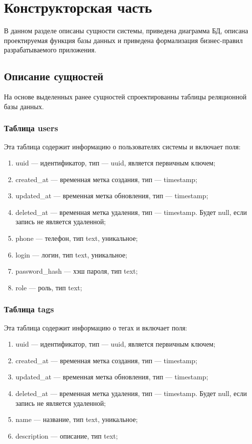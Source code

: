 \section{Конструкторская часть}

В данном разделе описаны сущности системы, приведена диаграмма БД, описана проектируемая функция базы данных и приведена формализация бизнес-правил разрабатываемого приложения.

\subsection{Описание сущностей}

На основе выделенных ранее сущностей спроектированны таблицы реляционной базы данных.

\subsubsection{Таблица users}

Эта таблица содержит информацию о пользователях системы и включает поля:

\begin{enumerate}[label=\arabic*.]
    \item uuid --- идентификатор, тип --- uuid, является первичным ключем;
    \item created\_at --- временная метка создания, тип --- timestamp;
    \item updated\_at --- временная метка обновления, тип --- timestamp;
    \item deleted\_at --- временная метка удаления, тип --- timestamp. Будет null, если запись не является удаленной;
    \item phone --- телефон, тип text, уникальное;
    \item login --- логин, тип text, уникальное;
    \item password\_hash --- хэш пароля, тип text;
    \item role --- роль, тип text;
\end{enumerate}

\subsubsection{Таблица tags}

Эта таблица содержит информацию о тегах и включает поля:

\begin{enumerate}[label=\arabic*.]
	\item uuid --- идентификатор, тип --- uuid, является первичным ключем;
	\item created\_at --- временная метка создания, тип --- timestamp;
	\item updated\_at --- временная метка обновления, тип --- timestamp;
	\item deleted\_at --- временная метка удаления, тип --- timestamp. Будет null, если запись не является удаленной;
	\item name --- название, тип text, уникальное;
	\item description --- описание, тип text;
\end{enumerate}

